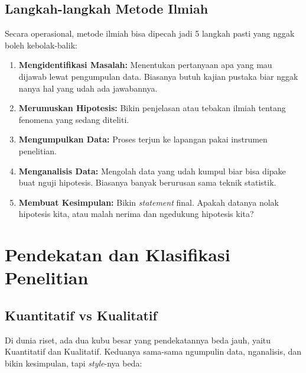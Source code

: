 \documentclass[12pt,a4paper]{article}
\begin{document}
\subsection{Langkah-langkah Metode Ilmiah}
Secara operasional, metode ilmiah bisa dipecah jadi 5 langkah pasti yang nggak boleh kebolak-balik:
\begin{enumerate}
    \item \textbf{Mengidentifikasi Masalah:} Menentukan pertanyaan apa yang mau dijawab lewat pengumpulan data. Biasanya butuh kajian pustaka biar nggak nanya hal yang udah ada jawabannya.
    \item \textbf{Merumuskan Hipotesis:} Bikin penjelasan atau tebakan ilmiah tentang fenomena yang sedang diteliti.
    \item \textbf{Mengumpulkan Data:} Proses terjun ke lapangan pakai instrumen penelitian.
    \item \textbf{Menganalisis Data:} Mengolah data yang udah kumpul biar bisa dipake buat nguji hipotesis. Biasanya banyak berurusan sama teknik statistik.
    \item \textbf{Membuat Kesimpulan:} Bikin \textit{statement} final. Apakah datanya nolak hipotesis kita, atau malah nerima dan ngedukung hipotesis kita?
\end{enumerate}

\newpage
\section{Pendekatan dan Klasifikasi Penelitian}

\subsection{Kuantitatif vs Kualitatif}
Di dunia riset, ada dua kubu besar yang pendekatannya beda jauh, yaitu Kuantitatif dan Kualitatif. Keduanya sama-sama ngumpulin data, nganalisis, dan bikin kesimpulan, tapi \textit{style}-nya beda:
\end{document}
